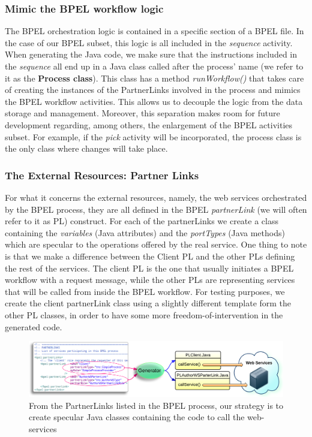 \subsubsection{Mimic the BPEL workflow logic}
\label{sec:mimicBPELLogic}
The BPEL orchestration logic is contained in a specific section of a BPEL file. In the case of our BPEL subset, this logic is all included in the \textit{sequence} activity. When generating the Java code, we make sure that the instructions included in the \textit{sequence} all end up in a Java class called after the process' name (we refer to it as the \textbf{Process class}). This class has a method \textit{runWorkflow()} that takes care of creating the instances of the PartnerLinks involved in the process and mimics the BPEL workflow activities.  
This allows us to decouple the logic from the data storage and management. Moreover, this separation makes room for future development regarding, among others, the enlargement of the BPEL activities subset. For example, if the \textit{pick} activity will be incorporated, the process class is the only class where changes will take place.

\subsubsection{The External Resources: Partner Links}
\label{sec:extrenalResources}
For what it concerns the external resources, namely, the web services orchestrated by the BPEL process, they are all defined in the BPEL \textit{partnerLink} (we will often refer to it as PL) construct. For each of the partnerLinks we create a class containing the \textit{variables} (Java attributes) and the \textit{portTypes} (Java methods) which are specular to the operations offered by the real service.
One thing to note is that we make a difference between the Client PL and the other PLs defining the rest of the services. The client PL is the one that usually initiates a BPEL workflow with a request message, while the other PLs are representing services that will be called from inside the BPEL workflow. For testing purposes, we create the client partnerLink class using a slightly different template form the other PL classes, in order to have some more freedom-of-intervention in the generated code.

\begin{figure}
  \begin{center}
    \includegraphics[scale=0.9]{pictures/PLTranslation.png}
    \caption{From the PartnerLinks listed in the BPEL process, our strategy is to create specular Java classes containing the code to call the web-services}
    \label{fig:PLTranslation}
  \end{center}
\end{figure} 

